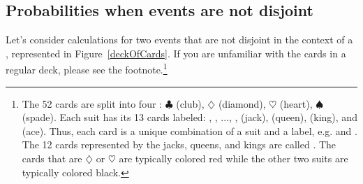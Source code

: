 

\D{\newpage}

\subsection{Probabilities when events are not disjoint}

Let's consider calculations for two events that are not disjoint in the context of a , represented in Figure~\ref{deckOfCards}. If you are unfamiliar with the cards in a regular deck, please see the footnote.\footnote{The 52 cards are split into four : $\clubsuit$ (club), {\color{redcards}$\diamondsuit$} (diamond), {\color{redcards}$\heartsuit$} (heart), $\spadesuit$ (spade). Each suit has its 13 cards labeled: , , ..., ,  (jack),  (queen),  (king), and  (ace). Thus, each card is a unique combination of a suit and a label, e.g. {\color{redcards}} and . The 12 cards represented by the jacks, queens, and kings are called . The cards that are {\color{redcards}$\diamondsuit$} or {\color{redcards}$\heartsuit$} are typically colored {\color{redcards}red} while the other two suits are typically colored black.}

